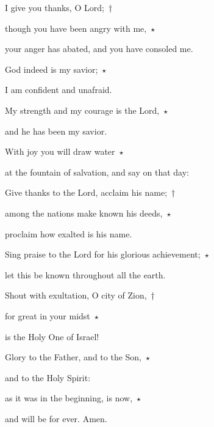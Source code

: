 \noindent I give you thanks, O Lord;~†~\nopagebreak

though you have been angry with me,~$\star$~\nopagebreak

your anger has abated, and you have consoled me.

\noindent God indeed is my savior;~$\star$~\nopagebreak

I am confident and unafraid.

\noindent My strength and my courage is the Lord,~$\star$~\nopagebreak

and he has been my savior.

\noindent With joy you will draw water~$\star$~\nopagebreak

at the fountain of salvation, and say on that day:

\noindent Give thanks to the Lord, acclaim his name;~†~\nopagebreak

among the nations make known his deeds,~$\star$~\nopagebreak

proclaim how exalted is his name.

\noindent Sing praise to the Lord for his glorious achievement;~$\star$~\nopagebreak

let this be known throughout all the earth.

\noindent Shout with exultation, O city of Zion,~†~\nopagebreak

for great in your midst~$\star$~\nopagebreak

is the Holy One of Israel!

\noindent Glory to the Father, and to the Son,~$\star$~\nopagebreak

and to the Holy Spirit:

\noindent as it was in the beginning, is now,~$\star$~\nopagebreak

and will be for ever. Amen.